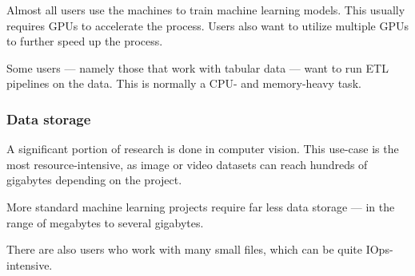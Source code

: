 Almost all users use the machines to train machine learning models. This usually requires GPUs to accelerate the process. Users also want to utilize multiple GPUs to further speed up the process.


Some users --- namely those that work with tabular data --- want to run ETL pipelines on the data. This is normally a CPU- and memory-heavy task.

\subsubsection{Data storage}

A significant portion of research is done in computer vision. This use-case is the most resource-intensive, as image or video datasets can reach hundreds of gigabytes depending on the project.


More standard machine learning projects require far less data storage --- in the range of megabytes to several gigabytes.

There are also users who work with many small files, which can be quite IOps-intensive.

